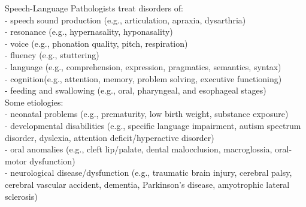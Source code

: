 Speech-Language Pathologists treat disorders of:\\
- speech sound production (e.g., articulation, apraxia, dysarthria)\\
- resonance (e.g., hypernasality, hyponasality)\\
- voice (e.g., phonation quality, pitch, respiration)\\
- fluency (e.g., stuttering)\\
- language (e.g., comprehension, expression, pragmatics, semantics, syntax)\\
- cognition(e.g., attention, memory, problem solving, executive functioning)\\
- feeding and swallowing (e.g., oral, pharyngeal, and esophageal stages) \\

Some etiologies:\\
- neonatal problems (e.g., prematurity, low birth weight, substance exposure)\\
- developmental disabilities (e.g., specific language impairment, autism spectrum
disorder, dyslexia, attention deficit/hyperactive disorder)\\
- oral anomalies (e.g., cleft lip/palate, dental malocclusion, macroglossia, oral-motor
dysfunction)\\
- neurological disease/dysfunction (e.g., traumatic brain injury, cerebral palsy, cerebral
vascular accident, dementia, Parkinson's disease, amyotrophic lateral sclerosis)\\



\begin{comment}
\section{Example glossary and acronyms}
%
%
This is the first occurrence of an abbreviation: \gls{abbrev}.

And now the second occurrence of the same abbreviation: \gls{abbrev}.

And a new acronym with capital letter: \Gls{xpt} and reused \gls{xpt}.

Lets add the term ``\gls{computer}'' to the glossary!

\end{comment}